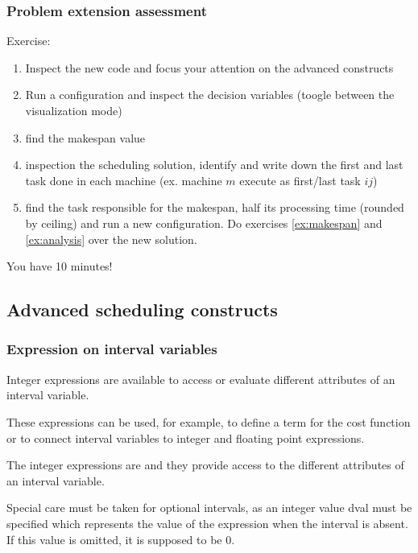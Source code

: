 \begin{frame} \frametitle{Problem extension assessment}
\pause
Exercise:\pause
\begin{enumerate}[<+->]
	\item Inspect the new code and focus your attention on the advanced constructs
	\item Run a configuration and inspect the decision variables (toogle between the visualization mode)
	\item \label{ex:makespan} find the makespan value
	\item \label{ex:analysis} inspection the scheduling solution, identify and write down the first and last task done in each machine (ex. machine $m$ execute as first/last task $ij$)
	\item find the task responsible for the makespan, half its processing time (rounded by ceiling) and run a new configuration. Do exercises \ref{ex:makespan} and \ref{ex:analysis} over the new solution.
\end{enumerate}

\pause \medskip

You have 10 minutes!

\end{frame}



\subsection{Advanced scheduling constructs}

\begin{frame} \frametitle{Expression on interval variables}

Integer expressions are available to access or evaluate different attributes of an interval variable. 

\pause\medskip

These expressions can be used, for example, to define a term for the cost function or to connect interval variables to integer and floating point expressions.

\pause\medskip

The integer expressions are  and they provide access to the different attributes of an interval variable.

\pause\medskip

Special care must be taken for optional intervals, as an integer value dval must be specified which represents the value of the expression when the interval is absent. If this value is omitted, it is supposed to be 0. 

\end{frame}

